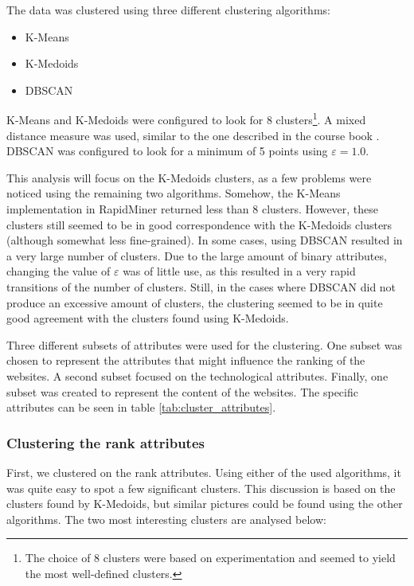 The data was clustered using three different clustering algorithms:

\begin{itemize}
\item K-Means
\item K-Medoids
\item DBSCAN
\end{itemize}

K-Means and K-Medoids were configured to look for 8 clusters\footnote{The choice of 8 clusters were based on experimentation and seemed to yield the most well-defined clusters.}. A mixed distance measure was used, similar to the one described in the course book \cite{book}. DBSCAN was configured to look for a minimum of 5 points using $\varepsilon = 1.0$.

This analysis will focus on the K-Medoids clusters, as a few problems were noticed using the remaining two algorithms. Somehow, the K-Means implementation in RapidMiner returned less than 8 clusters. However, these clusters still seemed to be in good correspondence with the K-Medoids clusters (although somewhat less fine-grained). In some cases, using DBSCAN resulted in a very large number of clusters. Due to the large amount of binary attributes, changing the value of $\varepsilon$ was of little use, as this resulted in a very rapid transitions of the number of clusters. Still, in the cases where DBSCAN did not produce an excessive amount of clusters, the clustering seemed to be in quite good agreement with the clusters found using K-Medoids.

Three different subsets of attributes were used for the clustering. One subset was chosen to represent the attributes that might influence the ranking of the websites. A second subset focused on the technological attributes. Finally, one subset was created to represent the content of the websites. The specific attributes can be seen in table \ref{tab:cluster_attributes}.

\subsubsection{Clustering the rank attributes}

First, we clustered on the rank attributes. Using either of the used algorithms, it was quite easy to spot a few significant clusters. This discussion is based on the clusters found by K-Medoids, but similar pictures could be found using the other algorithms. The two most interesting clusters are analysed below:

